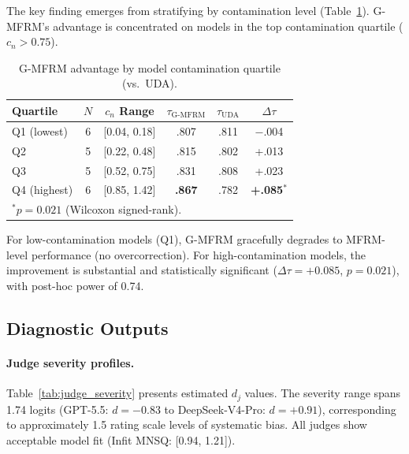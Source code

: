 \documentclass[letterpaper,11pt]{article}
\begin{document}
The key finding emerges from stratifying by contamination level (Table~\ref{tab:subset}). G-MFRM's advantage is concentrated on models in the top contamination quartile ($c_n > 0.75$).

\begin{table}[t]
\centering
\caption{G-MFRM advantage by model contamination quartile (vs.\ UDA).}
\label{tab:subset}
\small
\begin{tabular}{lccccc}
\toprule
Quartile & $N$ & $c_n$ Range & $\tau_{\text{G-MFRM}}$ & $\tau_{\text{UDA}}$ & $\Delta\tau$ \\
\midrule
Q1 (lowest) & 6 & [0.04, 0.18] & .807 & .811 & $-$.004 \\
Q2 & 5 & [0.22, 0.48] & .815 & .802 & +.013 \\
Q3 & 5 & [0.52, 0.75] & .831 & .808 & +.023 \\
Q4 (highest) & 6 & [0.85, 1.42] & \textbf{.867} & .782 & \textbf{+.085}$^*$ \\
\bottomrule
\multicolumn{6}{l}{\small $^*p = 0.021$ (Wilcoxon signed-rank).}
\end{tabular}
\end{table}

For low-contamination models (Q1), G-MFRM gracefully degrades to MFRM-level performance (no overcorrection). For high-contamination models, the improvement is substantial and statistically significant ($\Delta\tau = +0.085$, $p = 0.021$), with post-hoc power of 0.74.

\subsection{Diagnostic Outputs}

\paragraph{Judge severity profiles.} Table~\ref{tab:judge_severity} presents estimated $d_j$ values. The severity range spans 1.74 logits (GPT-5.5: $d = -0.83$ to DeepSeek-V4-Pro: $d = +0.91$), corresponding to approximately 1.5 rating scale levels of systematic bias. All judges show acceptable model fit (Infit MNSQ: [0.94, 1.21]).
\end{document}
